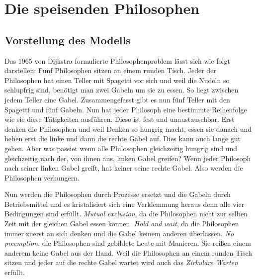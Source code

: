 \chapter{Die speisenden Philosophen}
\label{speisende_philosophen}






\section{Vorstellung des Modells}
\label{vorstellung}
Das 1965 von Dijkstra formulierte Philosophenproblem lässt sich wie folgt darstellen: Fünf Philosophen sitzen an einem runden Tisch. Jeder der Philosophen hat einen Teller mit Spagetti vor sich und weil die Nudeln so schlupfrig sind, benötigt man zwei Gabeln um sie zu essen. So liegt zwischen jedem Teller eine Gabel. Zusammengefasst gibt es nun fünf Teller mit den Spagetti und fünf Gabeln. Nun hat jeder Philosoph eine bestimmte Reihenfolge wie sie diese Tätigkeiten ausführen. Diese ist fest und unaustauschbar. Erst denken die Philosophen und weil Denken so hungrig macht, essen sie danach und heben erst die linke und dann die rechte Gabel auf. Dies kann auch lange gut gehen. Aber was passiet wenn alle Philosophen gleichzeitig hungrig sind und gleichzeitig nach der, von ihnen aus, linken Gabel greifen? Wenn jeder Philosoph nach seiner linken Gabel greift, hat keiner seine rechte Gabel. Also werden die Philosophen verhungern.\parencite[vgl.][S.220]{tanenbaum2016} 


Nun werden die Philosophen durch Prozesse ersetzt und die Gabeln durch Betriebsmittel und es kristalisiert sich eine Verklemmung heraus denn alle vier Bedingungen sind erfüllt. \textit{Mutual exclusion}, da die Philosophen nicht zur selben Zeit mit der gleichen Gabel essen können. \textit{Hold and wait}, da die Philosophen immer zuerst an sich denken und die Gabel keinem anderen überlassen. \textit{No preemption}, die Philosophen sind gebildete Leute mit Manieren. Sie reißen einem anderem keine Gabel aus der Hand. Weil die Philosophen an einem runden Tisch sitzen und jeder auf die rechte Gabel wartet wird auch das \textit{Zirkuläre Warten} erfüllt.


